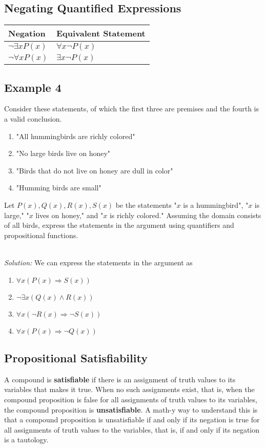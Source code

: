 \documentclass{article}
\begin{document}
\subsection{Negating Quantified Expressions}
\begin{center}
	\begin{tabular}{|l|l|}
		\hline
		Negation             & Equivalent Statement  \\
		\hline
		$\neg \exists xP(x)$ & $\forall x \neg P(x)$ \\
		$\neg \forall xP(x)$ & $\exists x \neg P(x)$ \\
		\hline
	\end{tabular}
\end{center}

\subsection*{Example 4}
Consider these statements, of which the first three are premises and the fourth is a valid conclusion.

\begin{enumerate}
	\item	"All hummingbirds are richly colored"
	\item "No large birds live on honey"
	\item	"Birds that do not live on honey are dull in color"
	\item	"Humming birds are small"
\end{enumerate}

\noindent Let $P(x), Q(x), R(x), S(x)$ be the statements "$x$ is a hummingbird", "$x$ is large," "$x$ lives on honey," and
"$x$ is richly colored."
Assuming the domain consists of all birds, express the statements in the argument using quantifiers and propositional functions.

\noindent \\ \textit{Solution:} We can express the statements in the argument as
\begin{enumerate}
	\item $\forall x (P(x) \Rightarrow S(x))$
	\item $\neg \exists x (Q(x) \wedge R(x))$
	\item $\forall x(\neg R(x) \Rightarrow \neg S(x))$
	\item $\forall x(P(x) \Rightarrow \neg Q(x))$
\end{enumerate}
\subsection{Propositional Satisfiability}
A compound is \textbf{satisfiable} if there is an assignment of truth values to its variables that makes it true.
When no such assignments exist, that is, when the compound proposition is false for all assignments of truth values to its variables,
the compound proposition is \textbf{unsatisfiable}. A math-y way to understand this is that a compound proposition is unsatisfiable if and only
if its negation is true for all assignments of truth values to the variables, that is, if and only if its negation is a tautology.
\end{document}
